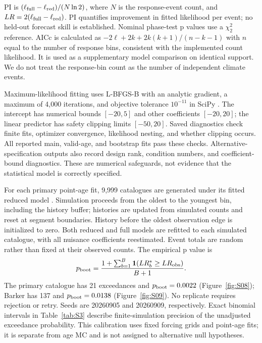 \documentclass[11pt]{article}
\begin{document}
PI is $(\ell_{\rm full}-\ell_{\rm red})/(N\ln2)$, where $N$ is the response-event count, and $LR=2(\ell_{\rm full}-\ell_{\rm red})$. PI quantifies improvement in fitted likelihood per event; no held-out forecast skill is established. Nominal phase-test p values use a $\chi^2_2$ reference. AICc is calculated as $-2\ell+2k+2k(k+1)/(n-k-1)$ with $n$ equal to the number of response bins, consistent with the implemented count likelihood. It is used as a supplementary model comparison on identical support. We do not treat the response-bin count as the number of independent climate events.

Maximum-likelihood fitting uses L-BFGS-B with an analytic gradient, a maximum of 4,000 iterations, and objective tolerance $10^{-11}$ in SciPy \citep{virtanen2020scipy}. The intercept has numerical bounds $[-20,5]$ and other coefficients $[-20,20]$; the linear predictor has safety clipping limits $[-50,20]$. Saved diagnostics check finite fits, optimizer convergence, likelihood nesting, and whether clipping occurs. All reported main, valid-age, and bootstrap fits pass these checks. Alternative-specification outputs also record design rank, condition numbers, and coefficient-bound diagnostics. These are numerical safeguards, not evidence that the statistical model is correctly specified.

For each primary point-age fit, 9,999 catalogues are generated under its fitted reduced model \citep{davison1997bootstrap}. Simulation proceeds from the oldest to the youngest bin, including the history buffer; histories are updated from simulated counts and reset at segment boundaries. History before the oldest observation edge is initialized to zero. Both reduced and full models are refitted to each simulated catalogue, with all nuisance coefficients reestimated. Event totals are random rather than fixed at their observed counts. The empirical p value is
\begin{equation}
 p_{\rm boot}=\frac{1+\sum_{b=1}^{B}\mathbf1(LR_b^*\geq LR_{\rm obs})}{B+1}.
\end{equation}
The primary catalogue has 21 exceedances and $p_{\rm boot}=0.0022$ (Figure~\ref{fig:S08}); Barker has 137 and $p_{\rm boot}=0.0138$ (Figure~\ref{fig:S09}). No replicate requires rejection or retry. Seeds are 20260905 and 20260909, respectively. Exact binomial intervals in Table~\ref{tab:S3} describe finite-simulation precision of the unadjusted exceedance probability. This calibration uses fixed forcing grids and point-age fits; it is separate from age MC and is not assigned to alternative null hypotheses.
\end{document}
